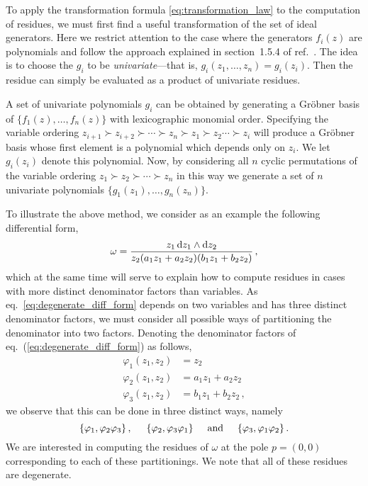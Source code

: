 \documentclass[dvipsnames,preprint,12pt,sort&compress]{elsarticle}
\def\d{{\rm d}}
\begin{document}
To apply the transformation formula \eqref{eq:transformation_law} to
the computation of residues, we must first find a useful transformation
of the set of ideal generators. Here we restrict attention to the case
where the generators $f_i(z)$ are polynomials and follow the approach explained
in section~1.5.4 of ref.~\cite{CattaniDickenstein}.
The idea is to choose the $g_i$ to be \emph{univariate}---that is,
$g_i (z_1, \ldots, z_n) = g_i(z_i)$. Then the residue can simply
be evaluated as a product of univariate residues.

A set of univariate polynomials $g_i$ can be obtained by generating
a Gr{\"o}bner basis
of $\{ f_1(z), \ldots, f_n(z) \}$ with lexicographic monomial order.
Specifying the variable ordering $z_{i+1} \succ z_{i+2} \succ \cdots \succ z_n \succ z_1
\succ z_2 \cdots \succ z_i$ will produce a Gr{\"o}bner basis
whose first element is a polynomial which depends only on $z_i$.
We let $g_i (z_i)$ denote this polynomial.
Now, by considering all $n$ cyclic permutations of the variable ordering
$z_1 \succ z_2 \succ \cdots \succ z_n$ in this way we generate a set of $n$
univariate polynomials $\{ g_1(z_1), \ldots, g_n(z_n) \}$.

To illustrate the above method, we consider as an example
the following differential form,
\begin{align}
\omega = \frac{z_1 \hspace{0.6mm} \d z_1\wedge \d z_2}{z_2 (a_1 z_1 + a_2 z_2)(b_1 z_1 + b_2 z_2)} \,,
\label{eq:degenerate_diff_form}
\end{align}
which at the same time will serve to explain how to compute residues in
cases with more distinct denominator factors than variables.
As eq.~\eqref{eq:degenerate_diff_form} depends on two variables and
has three distinct denominator factors, we must consider all possible
ways of partitioning the denominator into two factors. Denoting
the denominator factors of eq.~(\ref{eq:degenerate_diff_form}) as follows,
\begin{equation}
\begin{aligned}
\varphi_1 (z_1,z_2)  &=  z_2 \\
\varphi_2 (z_1,z_2)  &=  a_1 z_1 + a_2 z_2 \\
\varphi_3 (z_1,z_2)  &=  b_1 z_1 + b_2 z_2 \,,
\end{aligned}
\label{eq:denominator_factors_example}
\end{equation}
we observe that this can be done in three distinct ways, namely
\begin{equation}
\{ \varphi_1, \varphi_2 \varphi_3 \}\,, \hspace{5mm} \{ \varphi_2, \varphi_3 \varphi_1 \}
\hspace{5mm} \mathrm{and} \hspace{5mm} \{ \varphi_3, \varphi_1 \varphi_2 \} \,.
\label{eq:denominator_partitionings_example}
\end{equation}
We are interested in computing the residues of $\omega$ at the pole
$p = (0,0)$ corresponding to each of these partitionings. We note
that all of these residues are degenerate.
\end{document}
